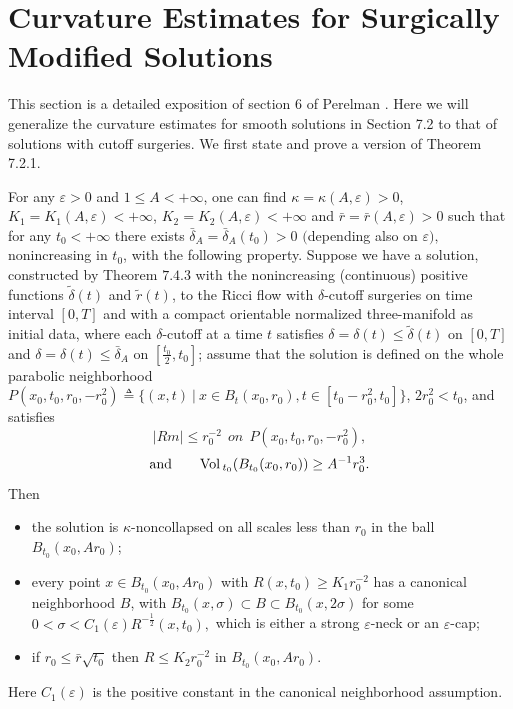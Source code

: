 \section{Curvature Estimates for Surgically Modified Solutions}

This section is a detailed exposition of section 6 of Perelman
\cite{P2}. Here we will generalize the curvature estimates for
smooth solutions in Section 7.2 to that of solutions with cutoff
surgeries. We first state and prove a version of Theorem 7.2.1.

\begin{theorem}
  \label{thm:cz-bounded-time-surgery-curvature-estimate}

For any $\varepsilon > 0$ and  $1 \leq A<+\infty$, one can find
$\kappa=\kappa(A,\varepsilon)>0$,
$K_1=K_1(A,\varepsilon)<+\infty$, $K_2=K_2(A,\varepsilon)<+\infty$
and $\bar{r}=\bar{r}(A,\varepsilon)>0$ such that for any
$t_0<+\infty$ there exists $\bar{\delta}_A=\bar{\delta}_A(t_0)>0$
$($depending also on $\varepsilon),$ nonincreasing in $t_0$, with
the following property. Suppose we have a solution, constructed by
Theorem $7.4.3$ with the nonincreasing (continuous) positive
functions $\widetilde{\delta}(t)$ and $\widetilde{r}(t)$, to the
Ricci flow with $\delta$-cutoff surgeries on time interval $[0,T]$
and with a compact orientable normalized three-manifold as initial
data, where each $\delta$-cutoff at a time $t$ satisfies
$\delta=\delta(t) \leq \widetilde{\delta}(t)$ on $[0,T]$ and
$\delta=\delta(t) \leq \bar{\delta}_A$ on $[\frac{t_0}{2},t_0]$;
assume that the solution is defined on the whole parabolic
neighborhood $P(x_0,t_0,r_0,-r^2_0)\triangleq\{(x,t)\ |\ x\in
B_t(x_0,r_0),t\in[t_0-r^2_0,t_0]\}$, $2r^2_0<t_0$, and satisfies
$$
|Rm|\leq r^{-2}_0 \ \ on \ \ P(x_0,t_0,r_0,-r^2_0),
$$
$$
\text{and} \qquad {\rm Vol}\,_{t_0}(B_{t_0}(x_0,r_0))\geq A^{-1}r^3_0.
$$
Then
\begin{itemize}
\item[(i)] the solution is $\kappa$-noncollapsed on all scales
less than $r_0$ in the ball $B_{t_0}(x_0,Ar_0)$; \item[(ii)] every
point $x\in B_{t_0}(x_0,Ar_0)$ with $R(x,t_0)\geq K_1r^{-2}_0$ has
a canonical neighborhood $B$, with $ B_{t_0}(x,\sigma)\subset
B\subset B_{t_0}(x,2\sigma)$ for some
$0<\sigma<C_1(\varepsilon)R^{-\frac{1}{2}}(x,t_0), $ which is
either a strong $\varepsilon$-neck or an $\varepsilon$-cap;
\item[(iii)] if $r_0\leq \bar{r}\sqrt{t_0}$ then $R\leq
K_2r^{-2}_0$ in $B_{t_0}(x_0,Ar_0)$.
\end{itemize}
Here $C_1(\varepsilon)$ is the positive constant in the canonical
neighborhood assumption.

\end{theorem}

